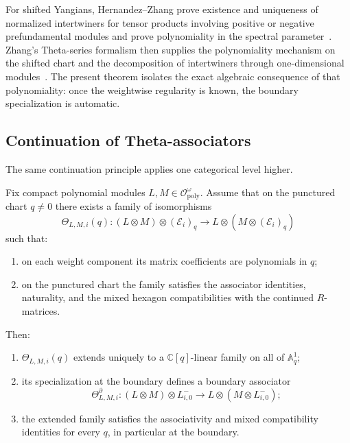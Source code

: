 \begin{remark}
\label{rem:why-R-matrix-hypotheses-are-natural}
For shifted Yangians, Hernandez--Zhang prove existence and uniqueness of
normalized intertwiners for tensor products involving positive or negative
prefundamental modules and prove polynomiality in the spectral
parameter~\cite{HZ24}.  Zhang's Theta-series formalism then supplies the
polynomiality mechanism on the shifted chart and the decomposition of
intertwiners through one-dimensional modules~\cite{ZhangTheta24}.  The
present theorem isolates the exact algebraic consequence of that
polynomiality: once the weightwise regularity is known, the boundary
specialization is automatic.
\end{remark}

\subsection{Continuation of Theta-associators}

The same continuation principle applies one categorical level higher.

\begin{theorem}
\ClaimStatusProvedHere
\label{thm:continuation-of-theta-associators}
Fix compact polynomial modules $L,M\in \mathcal O^{\omega}_{\mathrm{poly}}$.
Assume that on the punctured chart $q\neq 0$ there exists a family of
isomorphisms
\begin{equation}
\Theta_{L,M,i}(q):
(L\otimes M)\otimes (\mathcal E_i)_q
\longrightarrow
L\otimes (M\otimes (\mathcal E_i)_q)
\end{equation}
such that:
\begin{enumerate}
    \item on each weight component its matrix coefficients are
    polynomials in $q$;
    \item on the punctured chart the family satisfies the associator
    identities, naturality, and the mixed hexagon compatibilities with
    the continued $R$-matrices.
\end{enumerate}
Then:
\begin{enumerate}
    \item $\Theta_{L,M,i}(q)$ extends uniquely to a $\mathbb C[q]$-linear
    family on all of $\mathbb A^1_q$;
    \item its specialization at the boundary defines a boundary
    associator
    \begin{equation}
    \Theta^{\partial}_{L,M,i}:
    (L\otimes M)\otimes L^-_{i,0}
    \longrightarrow
    L\otimes (M\otimes L^-_{i,0});
    \end{equation}
    \item the extended family satisfies the associativity and mixed
    compatibility identities for every $q$, in particular at the
    boundary.
\end{enumerate}
\end{theorem}


